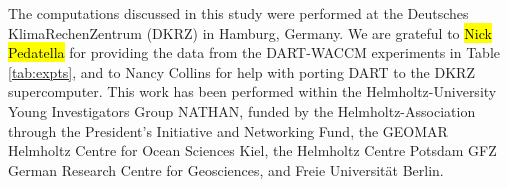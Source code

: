 The computations discussed in this study were performed at the Deutsches KlimaRechenZentrum (DKRZ) in Hamburg, Germany.
We are grateful to \hl{Nick Pedatella} for providing the data from the DART-WACCM experiments in Table \ref{tab:expts}, and to
Nancy Collins for help with porting DART to the DKRZ supercomputer.
This work has been performed within the Helmholtz-University Young Investigators Group NATHAN, funded by the Helmholtz-Association through the President's Initiative and Networking Fund, the GEOMAR Helmholtz Centre for Ocean Sciences Kiel, the Helmholtz Centre Potsdam GFZ German Research Centre for Geosciences, and Freie Universit\"at Berlin.

